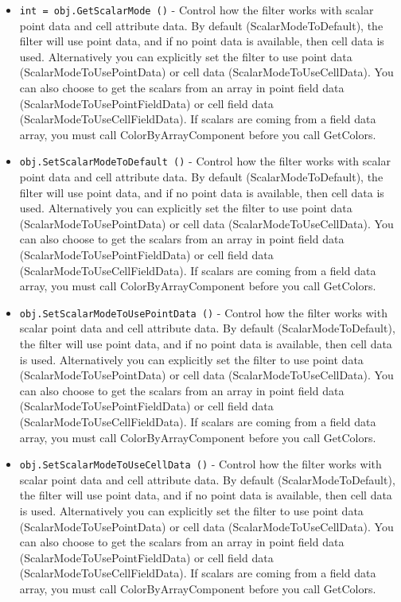 \begin{itemize}
\item  \verb|int = obj.GetScalarMode ()| -  Control how the filter works with scalar point data and cell attribute
 data.  By default (ScalarModeToDefault), the filter will use point data,
 and if no point data is available, then cell data is used. Alternatively
 you can explicitly set the filter to use point data
 (ScalarModeToUsePointData) or cell data (ScalarModeToUseCellData).
 You can also choose to get the scalars from an array in point field
 data (ScalarModeToUsePointFieldData) or cell field data
 (ScalarModeToUseCellFieldData).  If scalars are coming from a field
 data array, you must call ColorByArrayComponent before you call
 GetColors.

\item  \verb|obj.SetScalarModeToDefault ()| -  Control how the filter works with scalar point data and cell attribute
 data.  By default (ScalarModeToDefault), the filter will use point data,
 and if no point data is available, then cell data is used. Alternatively
 you can explicitly set the filter to use point data
 (ScalarModeToUsePointData) or cell data (ScalarModeToUseCellData).
 You can also choose to get the scalars from an array in point field
 data (ScalarModeToUsePointFieldData) or cell field data
 (ScalarModeToUseCellFieldData).  If scalars are coming from a field
 data array, you must call ColorByArrayComponent before you call
 GetColors.

\item  \verb|obj.SetScalarModeToUsePointData ()| -  Control how the filter works with scalar point data and cell attribute
 data.  By default (ScalarModeToDefault), the filter will use point data,
 and if no point data is available, then cell data is used. Alternatively
 you can explicitly set the filter to use point data
 (ScalarModeToUsePointData) or cell data (ScalarModeToUseCellData).
 You can also choose to get the scalars from an array in point field
 data (ScalarModeToUsePointFieldData) or cell field data
 (ScalarModeToUseCellFieldData).  If scalars are coming from a field
 data array, you must call ColorByArrayComponent before you call
 GetColors.

\item  \verb|obj.SetScalarModeToUseCellData ()| -  Control how the filter works with scalar point data and cell attribute
 data.  By default (ScalarModeToDefault), the filter will use point data,
 and if no point data is available, then cell data is used. Alternatively
 you can explicitly set the filter to use point data
 (ScalarModeToUsePointData) or cell data (ScalarModeToUseCellData).
 You can also choose to get the scalars from an array in point field
 data (ScalarModeToUsePointFieldData) or cell field data
 (ScalarModeToUseCellFieldData).  If scalars are coming from a field
 data array, you must call ColorByArrayComponent before you call
 GetColors.


\end{itemize}
